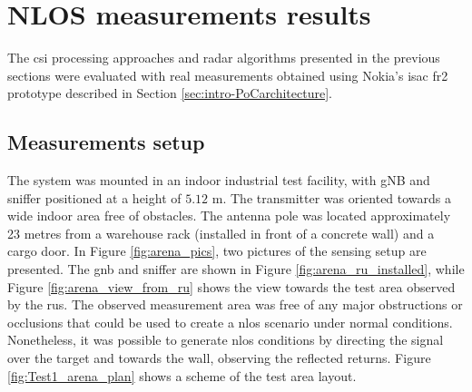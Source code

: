 \chapter{NLOS measurements results}

The \gls{csi} processing approaches and radar algorithms presented in the previous sections were evaluated with real measurements obtained using Nokia's \gls{isac} \gls{fr2} prototype described in Section \ref{sec:intro-PoCarchitecture}.

\section{Measurements setup}
\label{sec:Test1_meas_scenario}

The system was mounted in an indoor industrial test facility, with gNB and sniffer positioned at a height of $5.12$ m.
The transmitter was oriented towards a wide  indoor area free of obstacles. The antenna pole was located approximately 23 metres from a warehouse rack (installed in front of a concrete wall) and a cargo door.
In Figure \ref{fig:arena_pics}, two pictures of the sensing setup are presented. The \gls{gnb} and sniffer are shown in Figure \ref{fig:arena_ru_installed}, while Figure \ref{fig:arena_view_from_ru} shows the view towards the test area observed by the \glspl{ru}.
The observed measurement area was free of any major obstructions or occlusions that could be used to create a \gls{nlos} scenario under normal conditions.
Nonetheless, it was possible to generate \gls{nlos} conditions by directing the signal over the target and towards the wall, observing the reflected returns.
Figure \ref{fig:Test1_arena_plan} shows a scheme of the test area layout.

